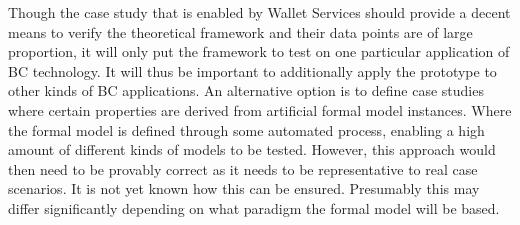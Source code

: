 \documentclass[]{article}
\begin{document}
Though the case study that is enabled by Wallet Services should provide a decent means to verify the theoretical framework and their data points are of large proportion, it will only put the framework to test on one particular application of BC technology. It will thus be important to additionally apply the prototype to other kinds of BC applications. An alternative option is to define case studies where certain properties are derived from artificial formal model instances. Where the formal model is defined through some automated process, enabling a high amount of different kinds of models to be tested. However, this approach would then need to be provably correct as it needs to be representative to real case scenarios. It is not yet known how this can be ensured. Presumably this may differ significantly depending on what paradigm the formal model will be based.
\end{document}
